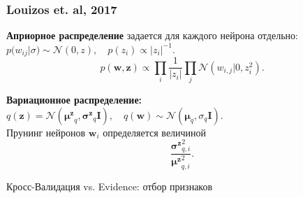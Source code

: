 \documentclass[10pt,pdf,utf8,russian,aspectratio=169]{beamer}
\begin{document}
\begin{frame}
\frametitle{ Louizos et. al, 2017}
\textbf{Априорное распределение} задается для каждого нейрона отдельно:
$p({w}_{ij}|\sigma) \sim \mathcal{N}(0, z), \quad p(z_i) \propto |z_i|^{-1}.$\\

$$p(\mathbf{w}, \mathbf{z}) \propto \prod_i \frac{1}{|z_i|} \prod_{j} \mathcal{N}(w_{i,j}|0,z_i^2).$$

\textbf{Вариационное распределение:} $q(\mathbf{z}) = \mathcal{N}(\boldsymbol{\mu^z}_q, \boldsymbol{\sigma^z}_q \mathbf{I}), \quad   q(\mathbf{w}) \sim \mathcal{N}(\boldsymbol{\mu}_q, \sigma_q \mathbf{I}).$\\


Прунинг нейронов $\mathbf{w}_i$ определяется величиной
\[
	\frac{\boldsymbol{\sigma^z}_{q,i}^2}{\boldsymbol{\mu^z}_{q,i}^2}.
\]
\end{frame}


\begin{frame}{Кросс-Валидация vs. Evidence: отбор признаков}
\begin{figure}
  \centering
\label{fig:1}\qquad

\end{figure}
\end{frame}
\end{document}
